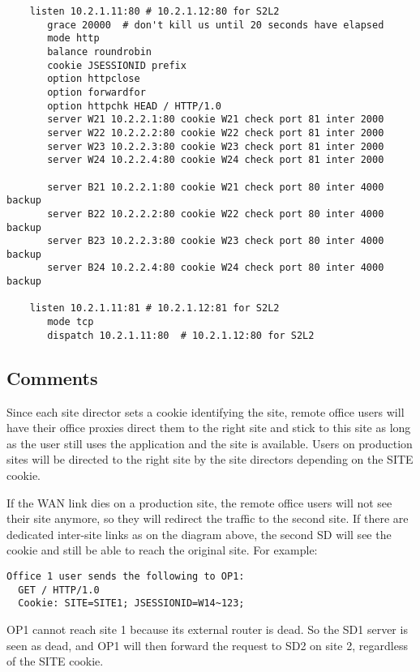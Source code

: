 \begin{verbatim}
    listen 10.2.1.11:80 # 10.2.1.12:80 for S2L2
       grace 20000  # don't kill us until 20 seconds have elapsed
       mode http
       balance roundrobin
       cookie JSESSIONID prefix
       option httpclose
       option forwardfor
       option httpchk HEAD / HTTP/1.0
       server W21 10.2.2.1:80 cookie W21 check port 81 inter 2000
       server W22 10.2.2.2:80 cookie W22 check port 81 inter 2000
       server W23 10.2.2.3:80 cookie W23 check port 81 inter 2000
       server W24 10.2.2.4:80 cookie W24 check port 81 inter 2000

       server B21 10.2.2.1:80 cookie W21 check port 80 inter 4000 backup
       server B22 10.2.2.2:80 cookie W22 check port 80 inter 4000 backup
       server B23 10.2.2.3:80 cookie W23 check port 80 inter 4000 backup
       server B24 10.2.2.4:80 cookie W24 check port 80 inter 4000 backup

    listen 10.2.1.11:81 # 10.2.1.12:81 for S2L2
       mode tcp
       dispatch 10.2.1.11:80  # 10.2.1.12:80 for S2L2
\end{verbatim}

\subsection{Comments}

Since each site director sets a cookie identifying the site, remote office
users will have their office proxies direct them to the right site and stick
to this site as long as the user still uses the application and the site is
available. Users on production sites will be directed to the right site by the
site directors depending on the SITE cookie.

If the WAN link dies on a production site, the remote office users will not
see their site anymore, so they will redirect the traffic to the second site.
If there are dedicated inter-site links as on the diagram above, the second
SD will see the cookie and still be able to reach the original site. For
example:

\begin{verbatim}
Office 1 user sends the following to OP1:
  GET / HTTP/1.0
  Cookie: SITE=SITE1; JSESSIONID=W14~123;
\end{verbatim}

OP1 cannot reach site 1 because its external router is dead. So the SD1 server
is seen as dead, and OP1 will then forward the request to SD2 on site 2,
regardless of the SITE cookie.

